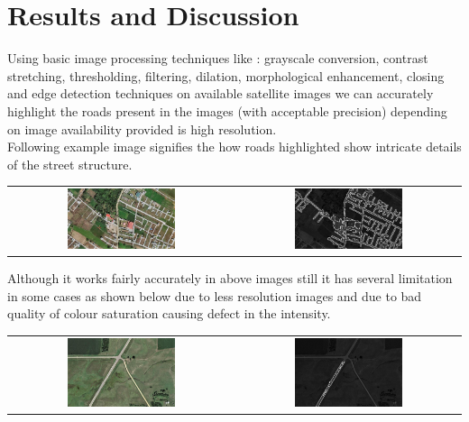 \documentclass[12pt,a4paper]{article}
\begin{document}
\section{Results and Discussion}
Using basic image processing techniques like : grayscale conversion, contrast stretching, thresholding, filtering, dilation, morphological enhancement, closing and edge detection techniques on available satellite images we can accurately highlight the roads present in the images (with acceptable precision) depending on image availability provided is high resolution.\\
Following example image signifies the how roads highlighted show intricate details of the street structure.
\begin{center}
\begin{tabular}{ c c}
 \includegraphics[width=0.5\textwidth]{./pictures/fimg8.png} & \includegraphics[width=0.5\textwidth]{./pictures/fimg8.png_final_img.jpg}
\end{tabular}
\end{center}
Although it works fairly accurately in above images still it has several limitation in some cases as shown below due to less resolution images and due to bad quality of colour saturation causing defect in the intensity.
\begin{center}
\begin{tabular}{ c c}
 \includegraphics[width=0.5\textwidth]{./pictures/fimg10.png} & \includegraphics[width=0.5\textwidth]{./pictures/fimg10.png_final_img.jpg}
\end{tabular}
\end{center}
\end{document}
